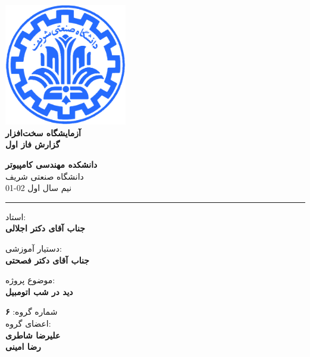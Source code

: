 \documentclass[12pt]{article}
\begin{document}
\begin{titlepage}
\begin{center}
        
\vspace*{0.7cm}

\includegraphics[width=0.4\textwidth]{sharif1.png}\\
\vspace{0.5cm}
\textbf{ \Huge{\emph ‌آزمایشگاه سخت‌افزار} }\\
\vspace{0.5cm}
\textbf{ \Large{گزارش فاز اول} }
\vspace{0.2cm}
       
 
      \large \textbf{دانشکده مهندسی کامپیوتر}\\\vspace{0.2cm}
    \large   دانشگاه صنعتی شریف\\\vspace{0.2cm}
       \large   ﻧﯿﻢ سال اول 02-01 \\\vspace{0.2cm}
      \noindent\rule[1ex]{\linewidth}{1pt}
استاد:\\
    \textbf{{جناب آقای دکتر اجلالی}}


دستیار آموزشی:\\
\textbf{{جناب آقای دکتر فصحتی}}

    \vspace{0.25cm}
    
    موضوع پروژه:\\
    
    \textbf{دید در شب اتومبیل}
    
    \vspace{0.35cm}
    
    
        شماره گروه:
    \textbf{{۶}}\\
    
اعضای گروه:\\

    \textbf{{علیرضا شاطری}}
    \\
   
     \textbf{{رضا امینی}}   
\end{center}
\end{titlepage}
\end{document}
